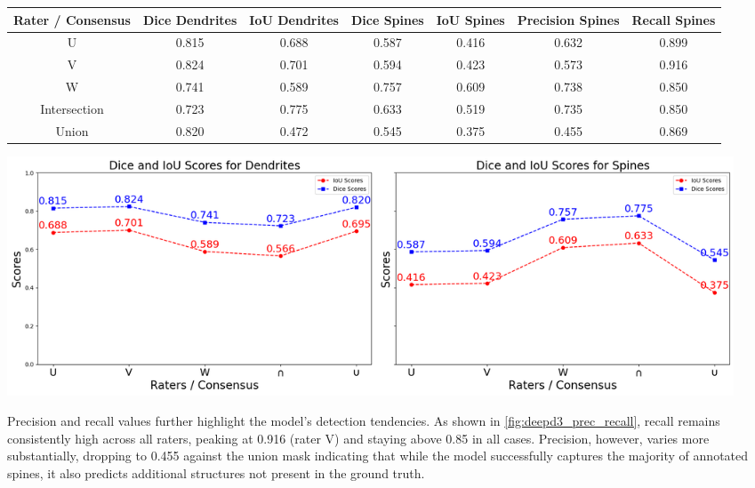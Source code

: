 \begin{table}[caption={Dice, \gls{IoU}, Precision, and Recall scores for dendrites and spines across raters, intersection, and union of \gls{DeepD3}.}, label=tab:deepd3_metrics]
\centering
\scriptsize
    \begin{tabular}{c c c c c c c}
        \toprule
        {\bf Rater / Consensus} & {\bf Dice Dendrites} & {\bf \gls{IoU} Dendrites} & {\bf Dice Spines} & {\bf \gls{IoU} Spines} & {\bf Precision Spines} & {\bf Recall Spines} \\ \midrule
            U & 0.815 & 0.688 & 0.587 & 0.416 & 0.632 & 0.899 \\
            V & 0.824 & 0.701 & 0.594 & 0.423 & 0.573 & 0.916 \\
            W & 0.741 & 0.589 & 0.757 & 0.609 & 0.738 & 0.850 \\
            Intersection & 0.723 & 0.775 & 0.633 & 0.519 & 0.735 & 0.850 \\
            Union & 0.820 & 0.472 & 0.545 & 0.375 & 0.455 & 0.869 \\
        \midrule
    \end{tabular}
\end{table}

\begin{center}
\includegraphics[width=0.95\textwidth]{figures/21_deepd3_dice_iou.png}
\label{fig:deepd3_dice_iou}
\end{center}

Precision and recall values further highlight the model’s detection tendencies. As shown in \autoref{fig:deepd3_prec_recall}, recall remains consistently high across all raters, peaking at 0.916 (rater V) and staying above 0.85 in all cases. Precision, however, varies more substantially, dropping to 0.455 against the union mask indicating that while the model successfully captures the majority of annotated spines, it also predicts additional structures not present in the ground truth.

